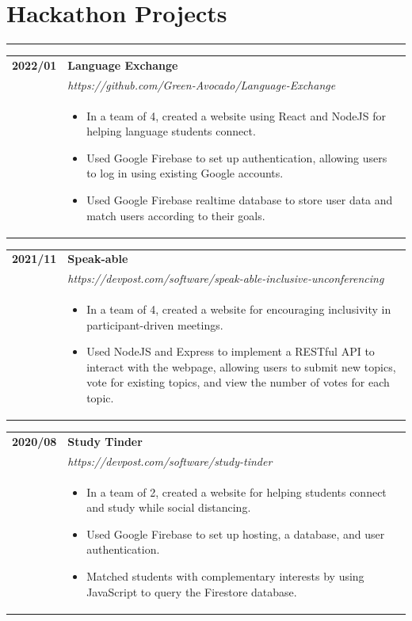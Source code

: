 \documentclass[letterpaper]{article}
\newcommand{\sect}[1]{\section*{#1}
                        {\color{cyan}
                        \rule{\textwidth}{1pt}
                        \vspace{-1ex}}}
\begin{document}
    \sect{Hackathon Projects}

        \begin{tabular}{p{} p{}}
            \textbf{2022/01} & \textbf{Language Exchange} \\
            & \emph{https://github.com/Green-Avocado/Language-Exchange} \\
            & \begin{itemize}
                \item In a team of 4, created a website using React and NodeJS for helping language
                    students connect.
                \item Used Google Firebase to set up authentication, allowing users to log in using
                    existing Google accounts.
                \item Used Google Firebase realtime database to store user data and match users according 
                    to their goals.
            \end{itemize}
        \end{tabular}

        \begin{tabular}{p{} p{}}
            \textbf{2021/11} & \textbf{Speak-able} \\
            & \emph{https://devpost.com/software/speak-able-inclusive-unconferencing} \\
            & \begin{itemize}
                \item In a team of 4, created a website for encouraging inclusivity in
                    participant-driven meetings.
                \item Used NodeJS and Express to implement a RESTful API to interact with the webpage,
                    allowing users to submit new topics, vote for existing topics, and view the number
                    of votes for each topic.
            \end{itemize}
        \end{tabular}

        \begin{tabular}{p{} p{}}
            \textbf{2020/08} & \textbf{Study Tinder} \\
            & \emph{https://devpost.com/software/study-tinder} \\
            & \begin{itemize}
                \item In a team of 2, created a website for helping students connect and study while
                    social distancing.
                \item Used Google Firebase to set up hosting, a database, and user authentication.
                \item Matched students with complementary interests by using JavaScript to query the
                    Firestore database.
            \end{itemize}
        \end{tabular}
\end{document}
